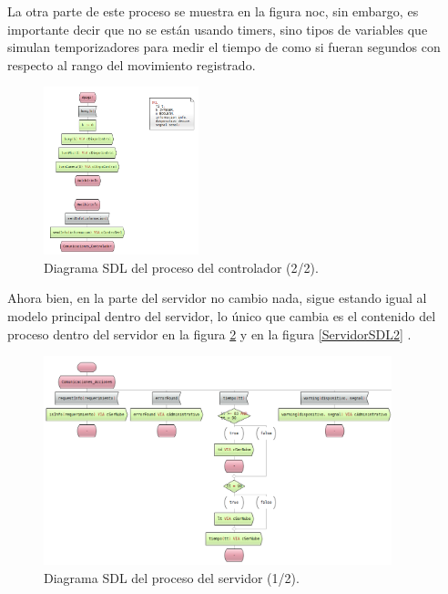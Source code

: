 \pagebreak

La otra parte de este proceso se muestra en la figura noc, sin embargo, es importante decir que no se están usando timers, sino tipos de variables que simulan temporizadores para medir el tiempo de como si fueran segundos con respecto al rango del movimiento registrado.

\begin{figure}[h]
    \centering
    \includegraphics[width=0.4\textwidth]{images/Proceso_Controlador2x.png}
    \caption{Diagrama SDL del proceso del controlador (2/2).}
    \label{ProcesoControladorSDL2}
\end{figure}

\pagebreak

Ahora bien, en la parte del servidor no cambio nada, sigue estando igual al modelo principal dentro del servidor, lo único que cambia es el contenido del proceso dentro del servidor en la figura \ref{ServidorSDL1} y en la figura \ref{ServidorSDL2} .

\begin{figure}[h]
    \centering
    \includegraphics[width=0.9\textwidth]{images/Proceso_Servidor1x.png}
    \caption{Diagrama SDL del proceso del servidor (1/2).}
    \label{ServidorSDL1}
\end{figure}

